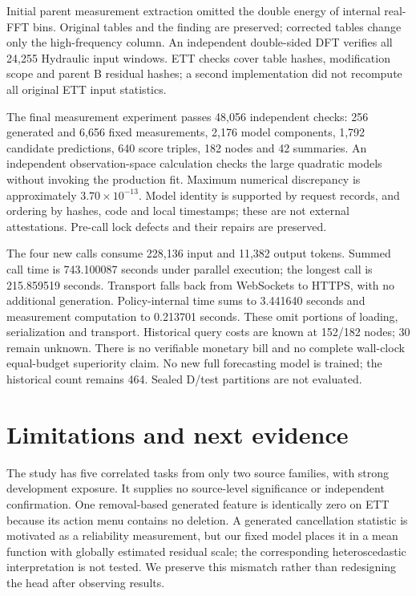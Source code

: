 \documentclass[10pt]{article}
\begin{document}
Initial parent measurement extraction omitted the double energy of internal real-FFT bins.
Original tables and the finding are preserved; corrected tables change only the high-frequency column.
An independent double-sided DFT verifies all 24,255 Hydraulic input windows.
ETT checks cover table hashes, modification scope and parent B residual hashes; a second implementation did not recompute all original ETT input statistics.

The final measurement experiment passes 48,056 independent checks:
256 generated and 6,656 fixed measurements, 2,176 model components, 1,792 candidate predictions, 640 score triples, 182 nodes and 42 summaries.
An independent observation-space calculation checks the large quadratic models without invoking the production fit.
Maximum numerical discrepancy is approximately $3.70\times10^{-13}$.
Model identity is supported by request records, and ordering by hashes, code and local timestamps; these are not external attestations.
Pre-call lock defects and their repairs are preserved.

The four new calls consume 228,136 input and 11,382 output tokens.
Summed call time is 743.100087 seconds under parallel execution; the longest call is 215.859519 seconds.
Transport falls back from WebSockets to HTTPS, with no additional generation.
Policy-internal time sums to 3.441640 seconds and measurement computation to 0.213701 seconds.
These omit portions of loading, serialization and transport.
Historical query costs are known at 152/182 nodes; 30 remain unknown.
There is no verifiable monetary bill and no complete wall-clock equal-budget superiority claim.
No new full forecasting model is trained; the historical count remains 464.
Sealed D/test partitions are not evaluated.

\section{Limitations and next evidence}
The study has five correlated tasks from only two source families, with strong development exposure.
It supplies no source-level significance or independent confirmation.
One removal-based generated feature is identically zero on ETT because its action menu contains no deletion.
A generated cancellation statistic is motivated as a reliability measurement, but our fixed model places it in a mean function with globally estimated residual scale; the corresponding heteroscedastic interpretation is not tested.
We preserve this mismatch rather than redesigning the head after observing results.
\end{document}
